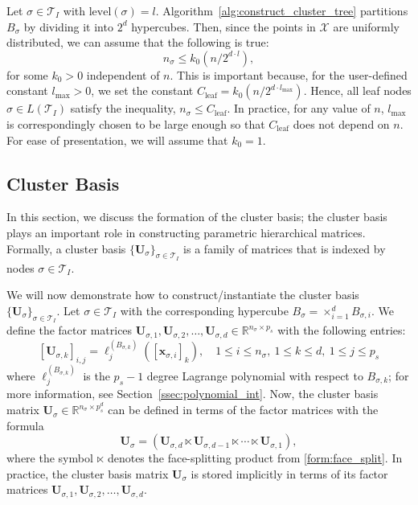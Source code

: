 \documentclass[final,3p,times]{elsarticle}
\newcommand{\mc}[1]{\mathcal{#1}}
\renewcommand{\vec}[1]{\boldsymbol{#1}}
\newcommand{\mat}[1]{\boldsymbol{#1}}
\newcommand{\R}{\mathbb{R}}
\begin{document}
 Let $\sigma \in \mc{T}_{I}$ with $\text{level}(\sigma) = l$. Algorithm~\ref{alg:construct_cluster_tree} partitions $B_{\sigma}$ by dividing it into $2^{d}$ hypercubes. Then, since the points in $\mc{X}$ are uniformly distributed, we can assume  that the following  is true:
\begin{equation}\label{eqn:nsigma}n_{\sigma} \le k_0(n/2^{d \cdot l}),\end{equation}
for some $k_0 > 0$ independent of $n$. This is important because, for the user-defined constant $l_{\max} > 0$, we set the constant $C_{\text{leaf}} = k_0(n/2^{d \cdot l_{\max}}).$ Hence, all leaf nodes  $\sigma \in L(\mc{T}_{I})$ satisfy the inequality, $n_{\sigma} \le  C_{\text{leaf}}.$ In practice, for any value of $n$, $l_{\max}$ is correspondingly chosen to be large enough so that $C_{\text{leaf}}$ does not depend on $n$. For ease of presentation, we will assume that  $k_0 = 1$.

\subsection{Cluster Basis}\label{sssec:Cluster_Basis}
In this section, we discuss the formation of the cluster basis; the cluster basis plays an important role in constructing parametric hierarchical matrices. Formally, a cluster basis $\{ \mat{U}_{\sigma} \}_{\sigma \in \mc{T}_{I}}$ is a family of matrices  that is indexed by nodes $\sigma \in \mc{T}_{I}$.





We will now demonstrate how to construct/instantiate the cluster basis $\{\mat{U}_{\sigma}\}_{\sigma \in \mc{T}_{I}}$. Let $\sigma \in \mc{T}_{I}$ with the corresponding hypercube $B_{\sigma} = \times_{i=1}^{d}B_{\sigma, i}$. We define the factor matrices $\mat{U}_{\sigma,1}, \mat{U}_{\sigma,2}, \dots, \mat{U}_{\sigma,d} \in \R^{n_{\sigma} \times p_s}$ with the following entries:
$$ [\mat{U}_{\sigma, k}]_{i, j} = \ell_{j}^{(B_{\sigma, k})}([\vec{x}_{\sigma, i}]_k), \quad 1 \le i \le n_{\sigma}, ~1\le k \le d, ~ 1 \le j \le p_s$$
where $\ell_{j}^{(B_{\sigma, k})}$ is the $p_s - 1$ degree Lagrange polynomial with respect to $B_{\sigma, k}$; for more information, see Section~\ref{ssec:polynomial_int}. 
Now, the cluster basis matrix $\mat{U}_{\sigma} \in \R^{n_{\sigma} \times p_s^d}$ can be defined in terms of the factor matrices with the  formula
$$ \mat{U}_{\sigma} = (\mat{U}_{\sigma, d} \ltimes \mat{U}_{\sigma, d-1} \ltimes \cdots \ltimes \mat{U}_{\sigma,1}),$$
where the symbol $\ltimes$ denotes the face-splitting product from \eqref{form:face_split}. In practice, the cluster basis matrix $\mat{U}_{\sigma}$ is stored implicitly in terms of its factor matrices $\mat{U}_{\sigma,1}, \mat{U}_{\sigma,2}, \dots, \mat{U}_{\sigma,d}$.
\end{document}

